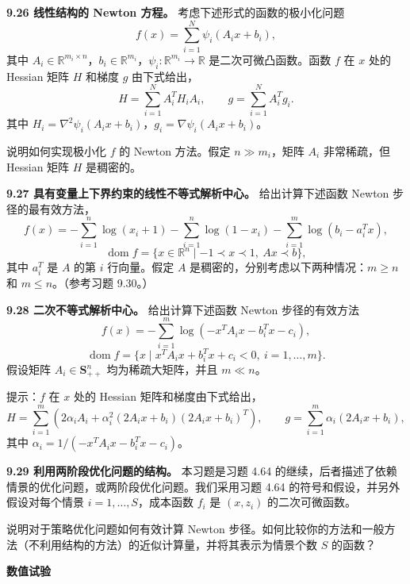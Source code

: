 \documentclass[UTF8,12pt,a4paper,fontset=fandol]{ctexart}
\begin{document}
\noindent\textbf{9.26 线性结构的 Newton 方程。}\quad
考虑下述形式的函数的极小化问题
\begin{equation}
f(x)=\sum_{i=1}^N\psi_i(A_ix+b_i),
\tag{9.63}
\end{equation}
其中 $A_i\in\mathbb{R}^{m_i\times n}$，$b_i\in\mathbb{R}^{m_i}$，$\psi_i:\mathbb{R}^{m_i}\to\mathbb{R}$ 是二次可微凸函数。函数 $f$ 在 $x$ 处的 Hessian 矩阵 $H$ 和梯度 $g$ 由下式给出，
\begin{equation}
H=\sum_{i=1}^N A_i^T H_i A_i,\qquad
g=\sum_{i=1}^N A_i^T g_i.
\tag{9.64}
\end{equation}
其中 $H_i=\nabla^2\psi_i(A_ix+b_i)$，$g_i=\nabla\psi_i(A_ix+b_i)$。

说明如何实现极小化 $f$ 的 Newton 方法。假定 $n\gg m_i$，矩阵 $A_i$ 非常稀疏，但 Hessian 矩阵 $H$ 是稠密的。

\noindent\textbf{9.27 具有变量上下界约束的线性不等式解析中心。}\quad
给出计算下述函数 Newton 步径的最有效方法，
\[
f(x)=-\sum_{i=1}^n\log(x_i+1)-\sum_{i=1}^n\log(1-x_i)-\sum_{i=1}^m\log(b_i-a_i^Tx),
\]
\[
\operatorname{dom} f=\{x\in\mathbb{R}^n\mid -1\prec x\prec1,\ Ax\prec b\},
\]
其中 $a_i^T$ 是 $A$ 的第 $i$ 行向量。假定 $A$ 是稠密的，分别考虑以下两种情况：$m\geq n$ 和 $m\leq n$。（参考习题 9.30。）

\noindent\textbf{9.28 二次不等式解析中心。}\quad
给出计算下述函数 Newton 步径的有效方法
\[
f(x)=-\sum_{i=1}^m\log(-x^TA_ix-b_i^Tx-c_i),
\]
\[
\operatorname{dom} f=\{x\mid x^TA_ix+b_i^Tx+c_i<0,\ i=1,\ldots,m\}.
\]
假设矩阵 $A_i\in\mathbf{S}_{++}^n$ 均为稀疏大矩阵，并且 $m\ll n$。

提示：$f$ 在 $x$ 处的 Hessian 矩阵和梯度由下式给出，
\[
H=\sum_{i=1}^m(2\alpha_iA_i+\alpha_i^2(2A_ix+b_i)(2A_ix+b_i)^T),
\qquad
g=\sum_{i=1}^m\alpha_i(2A_ix+b_i),
\]
其中 $\alpha_i=1/(-x^TA_ix-b_i^Tx-c_i)$。

\noindent\textbf{9.29 利用两阶段优化问题的结构。}\quad
本习题是习题 4.64 的继续，后者描述了依赖情景的优化问题，或两阶段优化问题。我们采用习题 4.64 的符号和假设，并另外假设对每个情景 $i=1,\ldots,S$，成本函数 $f_i$ 是 $(x,z_i)$ 的二次可微函数。

说明对于策略优化问题如何有效计算 Newton 步径。如何比较你的方法和一般方法（不利用结构的方法）的近似计算量，并将其表示为情景个数 $S$ 的函数？

\noindent\textbf{数值试验}
\end{document}
